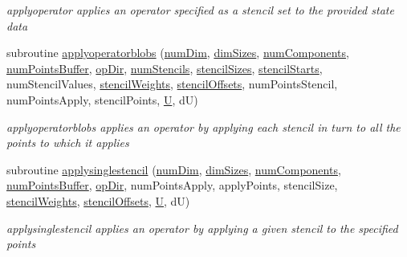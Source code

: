 \begin{DoxyCompactItemize}
\begin{DoxyCompactList}\small\item\em applyoperator applies an operator specified as a stencil set to the provided state data \end{DoxyCompactList}\item 
subroutine \hyperlink{namespaceoperators_a526cfaf4061ff38e8b9cba873cb1392c}{applyoperatorblobs} (\hyperlink{SATKernels_8H_a680185db8546de161968dabace9e94f1}{num\+Dim}, \hyperlink{SATKernels_8H_a338d2e6b5802f9ba652d355df0b1a04b}{dim\+Sizes}, \hyperlink{SimpleKernels_8H_abb39988074870d597c8d1cfcf61514ee}{num\+Components}, \hyperlink{WENOKernels_8H_a86c25ff33e6d9bccfabdf45dc5ddf24c}{num\+Points\+Buffer}, \hyperlink{OperatorKernels_8H_afc6f027cdb36bf6d86e573c2083e555b}{op\+Dir}, \hyperlink{OperatorKernels_8H_a3ebb77d78da88e132f012ab6788ff123}{num\+Stencils}, \hyperlink{OperatorKernels_8H_ad36f7e6638c24dc8cce030ebb48e32a4}{stencil\+Sizes}, \hyperlink{OperatorKernels_8H_ab81c9b92fc99d6a20e08f1ad1c9630b0}{stencil\+Starts}, num\+Stencil\+Values, \hyperlink{OperatorKernels_8H_a71782584f6f521c3d69ed8a53fbbbd59}{stencil\+Weights}, \hyperlink{OperatorKernels_8H_aace4e878476c6638c99ce2be58848e52}{stencil\+Offsets}, num\+Points\+Stencil, num\+Points\+Apply, stencil\+Points, \hyperlink{SimpleKernels_8H_aca4ab6143606c908fb1a7de286ddddae}{U}, dU)
\begin{DoxyCompactList}\small\item\em applyoperatorblobs applies an operator by applying each stencil in turn to all the points to which it applies \end{DoxyCompactList}\item 
subroutine \hyperlink{namespaceoperators_ac15b9cb3b0cb47f9a68c536b4f096941}{applysinglestencil} (\hyperlink{SATKernels_8H_a680185db8546de161968dabace9e94f1}{num\+Dim}, \hyperlink{SATKernels_8H_a338d2e6b5802f9ba652d355df0b1a04b}{dim\+Sizes}, \hyperlink{SimpleKernels_8H_abb39988074870d597c8d1cfcf61514ee}{num\+Components}, \hyperlink{WENOKernels_8H_a86c25ff33e6d9bccfabdf45dc5ddf24c}{num\+Points\+Buffer}, \hyperlink{OperatorKernels_8H_afc6f027cdb36bf6d86e573c2083e555b}{op\+Dir}, num\+Points\+Apply, apply\+Points, stencil\+Size, \hyperlink{OperatorKernels_8H_a71782584f6f521c3d69ed8a53fbbbd59}{stencil\+Weights}, \hyperlink{OperatorKernels_8H_aace4e878476c6638c99ce2be58848e52}{stencil\+Offsets}, \hyperlink{SimpleKernels_8H_aca4ab6143606c908fb1a7de286ddddae}{U}, dU)
\begin{DoxyCompactList}\small\item\em applysinglestencil applies an operator by applying a given stencil to the specified points \end{DoxyCompactList}\end{DoxyCompactItemize}


